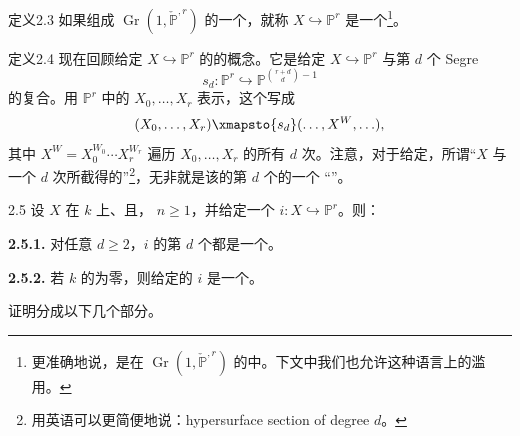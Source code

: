 \begin{SGAresult}{定义}{2.3}
如果组成 $\operatorname{Gr}(1,\check{\mathbb P}^{,r})$ 的一个，就称 $X\hookrightarrow\mathbb P^r$ 是一个\footnote{更准确地说，是在 $\operatorname{Gr}(1,\check{\mathbb P}^{,r})$ 的中。下文中我们也允许这种语言上的滥用。}。
\end{SGAresult}

\begin{SGAresult}{定义}{2.4}
现在回顾给定 $X\hookrightarrow\mathbb P^r$ 的的概念。它是给定 $X\hookrightarrow\mathbb P^r$ 与第 $d$ 个 Segre 
\[
s_d:\mathbb P^r\hookrightarrow\mathbb P^{\binom{r+d}{d}-1}
\]
的复合。用 $\mathbb P^r$ 中的 $X_0,\ldots,X_r$ 表示，这个写成
\[
(X_0,\ldots,X_r)\xmapsto{s_d}(\ldots,X^W,\ldots),
\]
其中 $X^W=X_0^{W_0}\cdots X_r^{W_r}$ 遍历 $X_0,\ldots,X_r$ 的所有 $d$ 次。注意，对于给定，所谓“$X$ 与一个 $d$ 次所截得的”\footnote{用英语可以更简便地说：hypersurface section of degree $d$。}，无非就是该的第 $d$ 个的一个
“”。
\end{SGAresult}

\begin{SGAresult}{}{2.5}
设 $X$ 在 $k$ 上、且， $n\geq1$，并给定一个 $i:X\hookrightarrow\mathbb P^r$。则：

\textbf{2.5.1.} 对任意 $d\geq2$，$i$ 的第 $d$ 个都是一个。

\textbf{2.5.2.} 若 $k$ 的为零，则给定的 $i$ 是一个。
\end{SGAresult}
证明分成以下几个部分。

